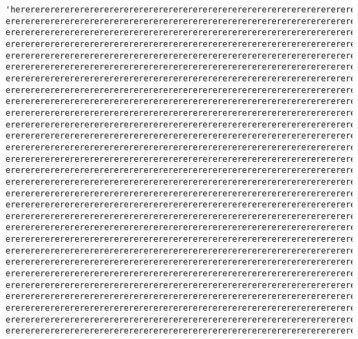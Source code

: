 \documentclass[11pt]{article}
\makeatletter
\newcommand{\boxspacing}{\kern\kvtcb@left@rule\kern\kvtcb@boxsep}
\newcommand{\prompt}[4]{
        \ttfamily\llap{{\color{#2}[#3]:\hspace{3pt}#4}}\vspace{-\baselineskip}
    }
\makeatother
\begin{document}
            \begin{tcolorbox}[breakable, size=fbox, boxrule=.5pt, pad at break*=1mm, opacityfill=0]
\prompt{Out}{outcolor}{12}{\boxspacing}
\begin{Verbatim}[commandchars=\\\{\}]
'hererererererererererererererererererererererererererererererererererererererer
erererererererererererererererererererererererererererererererererererererererer
erererererererererererererererererererererererererererererererererererererererer
erererererererererererererererererererererererererererererererererererererererer
erererererererererererererererererererererererererererererererererererererererer
erererererererererererererererererererererererererererererererererererererererer
erererererererererererererererererererererererererererererererererererererererer
erererererererererererererererererererererererererererererererererererererererer
erererererererererererererererererererererererererererererererererererererererer
erererererererererererererererererererererererererererererererererererererererer
erererererererererererererererererererererererererererererererererererererererer
erererererererererererererererererererererererererererererererererererererererer
erererererererererererererererererererererererererererererererererererererererer
erererererererererererererererererererererererererererererererererererererererer
erererererererererererererererererererererererererererererererererererererererer
erererererererererererererererererererererererererererererererererererererererer
erererererererererererererererererererererererererererererererererererererererer
erererererererererererererererererererererererererererererererererererererererer
erererererererererererererererererererererererererererererererererererererererer
erererererererererererererererererererererererererererererererererererererererer
erererererererererererererererererererererererererererererererererererererererer
erererererererererererererererererererererererererererererererererererererererer
erererererererererererererererererererererererererererererererererererererererer
erererererererererererererererererererererererererererererererererererererererer
erererererererererererererererererererererererererererererererererererererererer
erererererererererererererererererererererererererererererererererererererererer
erererererererererererererererererererererererererererererererererererererererer
erererererererererererererererererererererererererererererererererererererererer
erererererererererererererererererererererererererererererererererererererererer

\end{Verbatim}
\end{tcolorbox}
\end{document}
